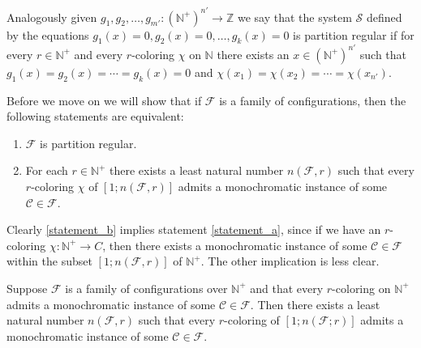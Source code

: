 Analogously given $g_1, g_2, \ldots, g_{m'}: (\mathbb{N}^{+})^{n'} \to \mathbb{Z}$ we say that the system $\mathcal{S}$ defined by the equations $g_1(x) = 0, g_2(x) = 0, \ldots, g_k(x) = 0$ is partition regular if for every $r \in \mathbb{N}^+$ and every $r$-coloring $\chi$ on $\mathbb{N}$ there exists an $x \in (\mathbb{N}^{+})^{n'}$ such that $g_1(x) = g_2(x) = \cdots = g_k(x) = 0$ and $\chi(x_1) = \chi(x_2) = \cdots = \chi(x_{n'})$.

Before we move on we will show that if $\mathcal{F}$ is a family of configurations, then the following statements are equivalent:
\begin{enumerate}[label=(PR\arabic*), leftmargin=*]
	\item $\mathcal{F}$ is partition regular. \label{statement_a}
	\item For each $r \in \mathbb{N}^{+}$ there exists a least natural number $n(\mathcal{F}, r)$ such that every $r$-coloring $\chi$ of $[1; n(\mathcal{F}, r)]$ admits a monochromatic instance of some $\mathcal{C} \in \mathcal{F}$. \label{statement_b}
\end{enumerate}
Clearly \ref{statement_b} implies statement \ref{statement_a}, since if we have an $r$-coloring $\chi: \mathbb{N}^+ \to C$, then there exists a monochromatic instance of some $\mathcal{C} \in \mathcal{F}$ within the subset $[1; n(\mathcal{F}, r)]$ of $\mathbb{N}^{+}$. The other implication is less clear.
\begin{lemma}\label{lem:compactness_principle}
	Suppose $\mathcal{F}$ is a family of configurations over $\mathbb{N}^{+}$ and that every $r$-coloring on $\mathbb{N}^{+}$ admits a monochromatic instance of some $\mathcal{C} \in \mathcal{F}$. Then there exists a least natural number $n(\mathcal{F}, r)$ such that every $r$-coloring of $[1; n(\mathcal{F}; r)]$ admits a monochromatic instance of some $\mathcal{C} \in \mathcal{F}$.
\end{lemma}
